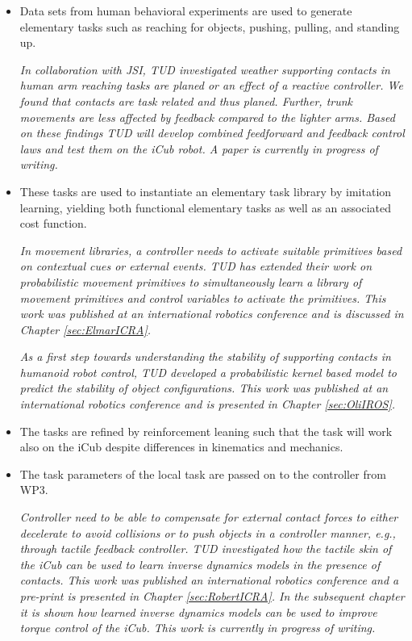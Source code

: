 \documentclass[12pt,a4paper,twoside]{report}
\begin{document}
\begin{itemize}
\item Data sets from human behavioral experiments are used to generate elementary tasks such as
reaching for objects, pushing, pulling, and standing up.

\textit{In collaboration with JSI, TUD investigated weather supporting contacts
in human arm reaching tasks are planed or an effect of a reactive controller. We
found that contacts are task related and thus planed. Further, trunk movements
are less affected by feedback compared to the lighter arms. Based on these
findings TUD will develop combined feedforward and feedback control laws and
test them on the iCub robot. A paper is currently in progress of writing.}

\item These tasks are used to instantiate an elementary task library by imitation learning, yielding both
functional elementary tasks as well as an associated cost function.

\textit{In movement libraries, a controller needs to activate suitable
primitives based on contextual cues or external events. TUD has extended their
work on probabilistic movement primitives to simultaneously learn a library of
movement primitives and control variables to activate the primitives. This work
was published at an international robotics conference \cite{Rueckert_2015} and
is discussed in Chapter \ref{sec:ElmarICRA}.}

\textit{As a first step towards understanding the stability of supporting 
contacts in humanoid robot control, TUD developed a probabilistic kernel based
model to predict the stability of object configurations. This work was published
at an international robotics conference \cite{KroemerIROS2014} and is presented
in Chapter \ref{sec:OliIROS}.}

\item The tasks are refined by reinforcement leaning such that the task will work also on the iCub despite
differences in kinematics and mechanics.
\item The task parameters of the local task are passed on to the controller from WP3.

\textit{Controller need to be able to compensate for external contact forces to
either decelerate to avoid collisions or to push objects in a controller manner,
e.g., through tactile feedback controller. TUD investigated how the tactile skin
of the iCub can be used to learn inverse dynamics models in the presence of
contacts. This work was published an international robotics conference
\cite{Calandra_ICRA15} and a pre-print is presented in Chapter
\ref{sec:RobertICRA}. In the subsequent chapter it is shown how learned  inverse
dynamics models can be used to improve torque control of the iCub. This work is
currently in progress of writing.} 



\end{itemize}
\end{document}
